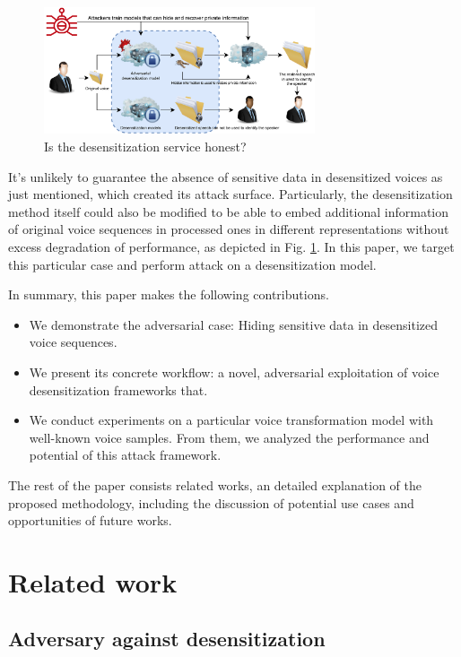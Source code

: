 \documentclass[journal]{IEEEtran} %
\begin{document}
\begin{figure}[htbp]
    \centerline{\includegraphics[width=8cm]{adversary.png}}
    \caption{Is the desensitization service honest?}
    \label{case4}
\end{figure}

It's unlikely to guarantee the absence of sensitive data in desensitized voices as just mentioned, which created its attack surface. Particularly, the desensitization method itself could also be modified to be able to embed additional information of original voice sequences in processed ones in different representations without excess degradation of performance\cite{a1}, as depicted in Fig. \ref{case4}. In this paper, we target this particular case and perform attack on a desensitization model.

In summary, this paper makes the following contributions.

\begin{itemize}

\item We demonstrate the adversarial case: Hiding sensitive data in desensitized voice sequences.

\item We present its concrete workflow: a novel, adversarial exploitation of voice desensitization frameworks that.

\item We conduct experiments on a particular voice transformation model with well-known voice samples. From them, we analyzed the performance and potential of this attack framework.

\end{itemize}
The rest of the paper consists related works, an detailed explanation of the proposed methodology, including the discussion of potential use cases and opportunities of future works.

\section{Related work}

\subsection{Adversary against desensitization}
\end{document}
